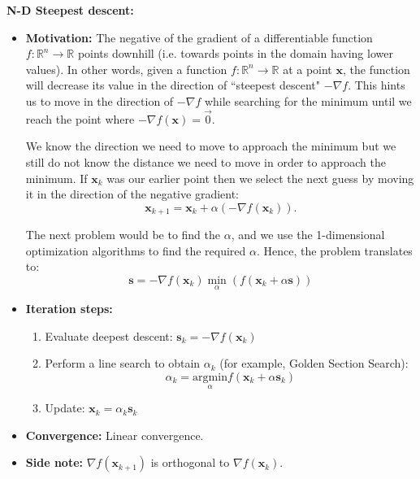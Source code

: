 \documentclass[12pt]{article}
\begin{document}
\medskip
\noindent \textbf{N-D Steepest descent:} 
\begin{itemize}
    \item \textbf{Motivation:} The negative of the gradient of a differentiable function $f : \mathbb{R}^n \to \mathbb{R}$ points downhill (i.e. towards points in the domain having lower values). In other words, given a function $f : \mathbb{R}^n \to \mathbb{R}$ at a point $\mathbf{x}$, the function will decrease its value in the direction of ``steepest descent" $-\nabla f$. This hints us to move in the direction of $-\nabla f$ while searching for the minimum until we reach the point where $-\nabla f(\mathbf{x}) = \vec{0}$. 

    We know the direction we need to move to approach the minimum but we still do not know the distance we need to move in order to approach the minimum. If $\mathbf{x}_k$ was our earlier point then we select the next guess by moving it in the direction of the negative gradient: 
    $$\mathbf{x}_{k+1} = \mathbf{x}_k + \alpha(-\nabla f(\mathbf{x}_k)).$$

    The next problem would be to find the $\alpha$, and we use the 1-dimensional optimization algorithms to find the required $\alpha$. Hence, the problem translates to: 
    $$\mathbf{s} = -\nabla f(\mathbf{x}_k) \min_{\alpha}\left( f\left(\mathbf{x}_k + \alpha \mathbf{s}\right)\right)$$

    \item \textbf{Iteration steps:}
        \begin{enumerate}
            \item Evaluate deepest descent: $\mathbf{s}_k = -\nabla f(\mathbf{x}_k)$
            \item Perform a line search to obtain $\alpha_k$ (for example, Golden Section Search): 
            $$\alpha_k = \underset{\alpha}{\mathrm{argmin}} f(\mathbf{x}_k + \alpha \mathbf{s}_k)$$
            \item Update: $\mathbf{x}_k = \alpha_k \mathbf{s}_k$
        \end{enumerate}
    \item \textbf{Convergence:} Linear convergence.
    \item \textbf{Side note:} $\nabla f(\mathbf{x}_{k+1})$ is orthogonal to $\nabla f(\mathbf{x}_k)$.
\end{itemize}
\end{document}
